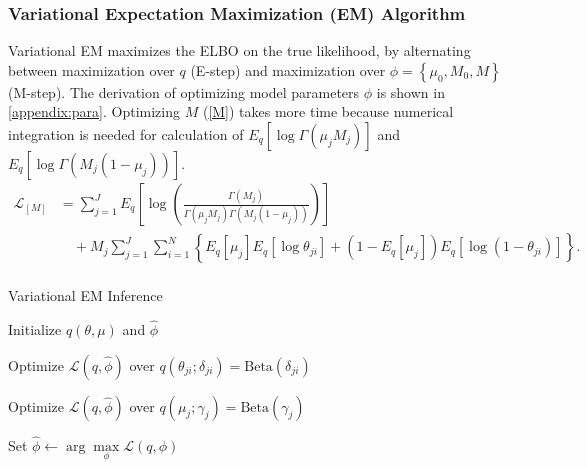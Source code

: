 \documentclass[11pt,reqno]{amsart}
\begin{document}
\subsubsection{Variational Expectation Maximization (EM) Algorithm}
Variational EM maximizes the ELBO on the true likelihood, by alternating between maximization over $q$ (E-step) and maximization over $\phi= \left\{\mu_0, M_0, M \right\}$ (M-step).
The derivation of optimizing model parameters $\phi $ is shown in \ref{appendix:para}.
Optimizing $M$ (\ref{M}) takes more time because numerical integration is needed for calculation of $  E_q  \left[ \log \Gamma(\mu_j M_j) \right] $ and $ E_q  \left[ \log \Gamma(M_j (1-\mu_j)) \right] $.
\begin{equation}
\begin{split}
\label{M}
\mathcal{L}_{{[M]}}
&= \sum_{j=1}^{J} E_q  \left[ \log \left( \frac{ \Gamma(M_j) } { \Gamma(\mu_j M_j) \Gamma(M_j (1-\mu_j)) }\right) \right] \\
&\quad + M_j \sum_{j=1}^{J} \sum_{i=1}^{N} \left\lbrace E_q \left[ \mu_j \right] E_q \left[ \log \theta_{ji} \right] + \left( 1 - E_q\left[ \mu_j \right]  \right) E_q\left[ \log \left( 1 - \theta_{ji}\right) \right] \right\rbrace. \\
\end{split}
\end{equation}

\begin{algorithm}[h]
  \caption{Variational EM Inference}

  \begin{algorithmic}[1]

  \State Initialize $ q(\theta, \mu) $ and $\hat{\phi}$

  \Repeat

	\Repeat
	
			\State Optimize $\mathcal{L}(q, \hat{\phi})$ over $q(\theta_{ji}; \delta_{ji}) = \text{Beta} (\delta_{ji})$				
			\EndFor			
		\EndFor
	
			\State Optimize $\mathcal{L}(q, \hat{\phi})$ over $q(\mu_j; \gamma_j) = \text{Beta} (\gamma_j)$			
		\EndFor
	

  \State Set $\hat{\phi} \leftarrow \arg \max\limits_{\phi}
            \mathcal{L}(q,\phi)$

  \end{algorithmic}

\end{algorithm}
\end{document}
